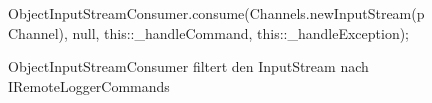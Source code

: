 \begin{figure}[h] 
    \centering
	\begin{spacing}{0.75}
		\begin{javacode}[firstnumber=23]
  ObjectInputStreamConsumer.consume(Channels.newInputStream(pChannel), null, 
                                      this::_handleCommand, this::_handleException);\end{javacode}
	\end{spacing}
	\caption{ObjectInputStreamConsumer filtert den InputStream nach IRemoteLoggerCommands}
\end{figure}